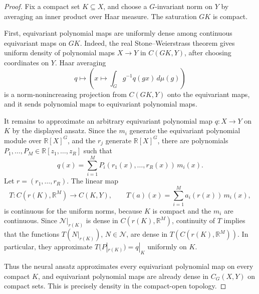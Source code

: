 \documentclass[11pt]{article}
\newcommand{\dsR}{\mathbb{R}}
\newcommand{\scN}{\mathcal{N}}
\theoremstyle{definition}
\begin{document}
\begin{proof}
  Fix a compact set $K\subseteq X$, and choose a $G$-invariant norm on $Y$ by averaging an inner product over Haar measure.
  The saturation $GK$ is compact.

  First, equivariant polynomial maps are uniformly dense among continuous equivariant maps on $GK$.
  Indeed, the real Stone--Weierstrass theorem gives uniform density of polynomial maps $X\to Y$ in $C(GK,Y)$, after choosing coordinates on $Y$.
  Haar averaging
  \[
    q
    \longmapsto
    \left(x\mapsto \int_G g^{-1}q(gx)\,d\mu(g)\right)
  \]
  is a norm-nonincreasing projection from $C(GK,Y)$ onto the equivariant maps, and it sends polynomial maps to equivariant polynomial maps.

  It remains to approximate an arbitrary equivariant polynomial map $q\colon X\to Y$ on $K$ by the displayed ansatz.
  Since the $m_i$ generate the equivariant polynomial module over $\dsR[X]^G$, and the $r_j$ generate $\dsR[X]^G$, there are polynomials $P_1,\dots,P_M\in\dsR[z_1,\dots,z_R]$ such that
  \[
    q(x)
    =
    \sum_{i=1}^M P_i(r_1(x),\dots,r_R(x))\,m_i(x).
  \]
  Let $r=(r_1,\dots,r_R)$.
  The linear map
  \[
    T\colon C(r(K),\dsR^M)\to C(K,Y),
    \qquad
    T(a)(x)=\sum_{i=1}^M a_i(r(x))\,m_i(x),
  \]
  is continuous for the uniform norms, because $K$ is compact and the $m_i$ are continuous.
  Since $\scN|_{r(K)}$ is dense in $C(r(K),\dsR^M)$, continuity of $T$ implies that the functions $T(N|_{r(K)})$, $N\in\scN$, are dense in $T(C(r(K),\dsR^M))$.
  In particular, they approximate $T(P|_{r(K)})=q|_K$ uniformly on $K$.

  Thus the neural ansatz approximates every equivariant polynomial map on every compact $K$, and equivariant polynomial maps are already dense in $C_G(X,Y)$ on compact sets.
  This is precisely density in the compact-open topology.
\end{proof}
\end{document}

